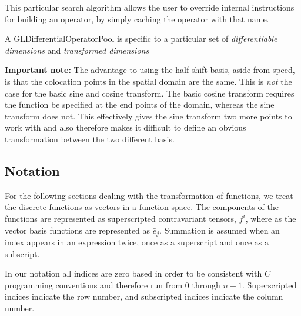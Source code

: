 \documentclass[11pt]{article}
\begin{document}
This particular search algorithm allows the user to override internal instructions for building an operator, by simply caching the operator with that name.

A GLDifferentialOperatorPool is specific to a particular set of \emph{differentiable dimensions} and \emph{transformed dimensions}

\textbf{Important note:} The advantage to using the half-shift basis, aside from speed, is that the colocation points in the spatial domain are the same. This is \emph{not} the case for the basic sine and cosine transform. The basic cosine transform requires the function be specified at the end points of the domain, whereas the sine transform does not. This effectively gives the sine transform two more points to work with and also therefore makes it difficult to define an obvious transformation between the two different basis.

%
\subsection{Notation}
%

For the following sections dealing with the transformation of functions, we treat the discrete functions as vectors in a function space. The components of the functions are represented as superscripted contravariant tensors, $f^i$, where as the vector basis functions are represented as $\bar{e}_j$. Summation is assumed when an index appears in an expression twice, once as a superscript and once as a subscript.

In our notation all indices are zero based in order to be consistent with $C$ programming conventions and therefore run from $0$ through $n-1$. Superscripted indices indicate the row number, and subscripted indices indicate the column number.
\end{document}
